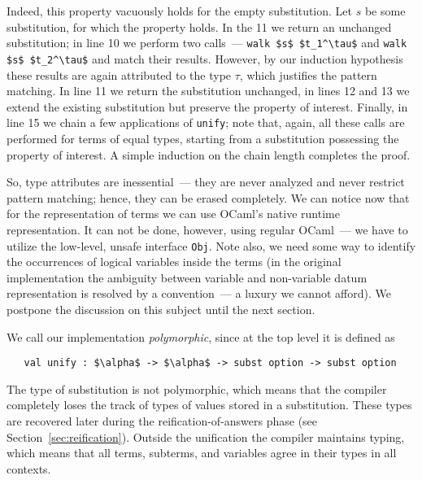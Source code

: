 Indeed, this property vacuously holds for the empty substitution. Let $s$ be some substitution, for which the
property holds. In the 11 we return an unchanged substitution; in line 10 we perform two calls~---
\lstinline|walk $s$ $t_1^\tau$| and \lstinline|walk $s$ $t_2^\tau$| and match their results. However,
by our induction hypothesis these results are again attributed to the type $\tau$, which justifies the
pattern matching. In line 11 we return the substitution unchanged, in lines 12 and 13 we extend the
existing substitution but preserve the property of interest. Finally, in line 15 we chain a few
applications of \lstinline|unify|; note that, again, all these calls are performed for terms of equal
types, starting from a substitution possessing the property of interest.
A simple induction on the chain length completes the proof.

So, type attributes are inessential~--- they are never analyzed and never restrict pattern matching; hence,
they can be erased completely.
We can notice now that for the representation of terms we can use OCaml's native runtime representation.
It can not be done, however, using regular OCaml~--- we have to utilize the low-level, unsafe interface \lstinline|Obj|.
Note also, we need some way to identify the occurrences of logical variables inside the terms (in the original \miniKanren{} implementation the ambiguity between variable and non-variable datum representation is resolved by a convention~--- a luxury we cannot afford).
We postpone the discussion on this subject until the next section.



We call our implementation \emph{polymorphic}, since at the top level it is defined as

\begin{lstlisting}
   val unify : $\alpha$ -> $\alpha$ -> subst option -> subst option
\end{lstlisting}

The type of substitution is not polymorphic, which means that the compiler completely loses the track
of types of values stored in a substitution. These types are recovered later during the reification-of-answers phase (see Section~\ref{sec:reification}).
Outside the unification the compiler maintains typing, which means that all terms, subterms, and variables agree in their types
in all contexts.
